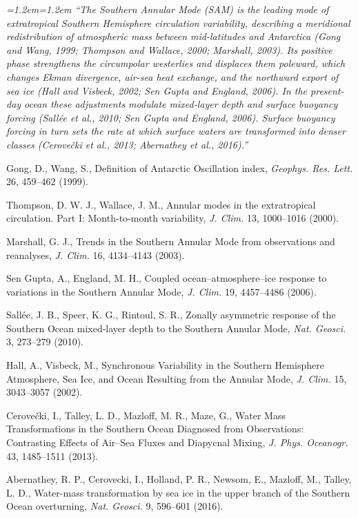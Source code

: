 \documentclass[11pt,a4paper]{article}
\newenvironment{change}{\par\smallskip\color{chgcol}\small\itshape\leftskip=1.2em\rightskip=1.2em\noindent\ignorespaces}{\par\smallskip}
\begin{document}
\begin{change}
``The Southern Annular Mode (SAM) is the leading mode of extratropical Southern Hemisphere circulation variability, describing a meridional redistribution of atmospheric mass between mid-latitudes and Antarctica (Gong and Wang, 1999; Thompson and Wallace, 2000; Marshall, 2003). Its positive phase strengthens the circumpolar westerlies and displaces them poleward, which changes Ekman divergence, air-sea heat exchange, and the northward export of sea ice (Hall and Visbeck, 2002; Sen Gupta and England, 2006). In the present-day ocean these adjustments modulate mixed-layer depth and surface buoyancy forcing (Sallée et al., 2010; Sen Gupta and England, 2006). Surface buoyancy forcing in turn sets the rate at which surface waters are transformed into denser classes (Cerovečki et al., 2013; Abernathey et al., 2016).''
\end{change}

Gong, D., Wang, S., Definition of Antarctic Oscillation index, \textit{Geophys. Res. Lett.} 26, 459–462 (1999).

Thompson, D. W. J., Wallace, J. M., Annular modes in the extratropical circulation. Part I: Month-to-month variability, \textit{J. Clim.} 13, 1000–1016 (2000).

Marshall, G. J., Trends in the Southern Annular Mode from observations and reanalyses, \textit{J. Clim.} 16, 4134–4143 (2003).

Sen Gupta, A., England, M. H., Coupled ocean–atmosphere–ice response to variations in the Southern Annular Mode, \textit{J. Clim.} 19, 4457–4486 (2006).

Sallée, J. B., Speer, K. G., Rintoul, S. R., Zonally asymmetric response of the Southern Ocean mixed-layer depth to the Southern Annular Mode, \textit{Nat. Geosci.} 3, 273–279 (2010).

Hall, A., Visbeck, M., Synchronous Variability in the Southern Hemisphere Atmosphere, Sea Ice, and Ocean Resulting from the Annular Mode, \textit{J. Clim.} 15, 3043–3057 (2002).

Cerovečki, I., Talley, L. D., Mazloff, M. R., Maze, G., Water Mass Transformations in the Southern Ocean Diagnosed from Observations: Contrasting Effects of Air–Sea Fluxes and Diapycnal Mixing, \textit{J. Phys. Oceanogr.} 43, 1485–1511 (2013).

Abernathey, R. P., Cerovecki, I., Holland, P. R., Newsom, E., Mazloff, M., Talley, L. D., Water-mass transformation by sea ice in the upper branch of the Southern Ocean overturning, \textit{Nat. Geosci.} 9, 596–601 (2016).
\end{document}
